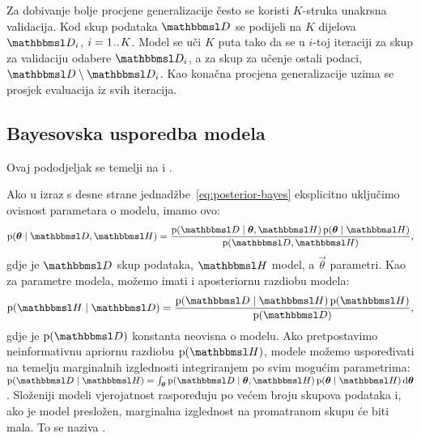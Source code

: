 \documentclass[utf8, diplomski, lmodern]{fer}
\begin{document}
Za dobivanje bolje procjene generalizacije često se koristi $K$-struka unakrsna validacija. Kod  skup podataka $\set D$ se podijeli na $K$ dijelova $\set D_i$, $i=1\mkern1.5mu{..}\mkern1.5mu K$. Model se uči $K$ puta tako da se u $i$-toj iteraciji za skup za validaciju odabere $\set D_i$, a za skup za učenje ostali podaci, $\set D\setminus\set D_i$. Kao konačna procjena generalizacije uzima se prosjek evaluacija iz svih iteracija.


\subsection{Bayesovska usporedba modela}

Ovaj pododjeljak se temelji na \cite{Murray:2005:NEBOR} i \cite[odjeljak 5.3]{Murphy:2012:MLPP}.

Ako u izraz s desne strane jednadžbe~\ref{eq:posterior-bayes} eksplicitno uključimo ovisnost parametara o modelu, imamo ovo:
\begin{align}
\p(\vec\theta\mid\set D,\set H) 
= \frac{\p(\set{D}\mid\vec\theta,\set H)\p(\vec\theta\mid\set H)}{\p(\set D,\set H)} \text{,}
\end{align}
gdje je $\set D$ skup podataka, $\set H$ model, a $\vec\theta$ parametri. Kao za parametre modela, možemo imati i aposteriornu razdiobu modela:
\begin{align}
\p(\set H\mid\set D) 
= \frac{\p(\set{D}\mid\set H)\p(\set H)}{\p(\set D)} \text{,}
\end{align}
gdje je $\p(\set D)$ konstanta neovisna o modelu. Ako pretpostavimo neinformativnu apriornu razdiobu $\p(\set H)$, modele možemo uspoređivati na temelju marginalnih izglednosti integriranjem po svim mogućim parametrima: $\p(\set{D}\mid\set H)=\int_{\vec\theta}\p(\set{D}\mid\vec\theta,\set H)\p(\vec\theta\mid\set H)\dif\vec\theta$. Složeniji modeli vjerojatnost raspoređuju po većem broju skupova podataka i, ako je model presložen, marginalna izglednost na promatranom skupu će biti mala. To se naziva  \citep{MacKay:1992:BMAM}.
\end{document}
